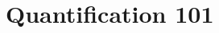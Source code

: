 \documentclass{article}
\numberwithin{equation}{section}
\theoremstyle{solution}
\begin{document}
\subsection{}
\subsection{}

\section{Quantification 101}

\subsection{}
\subsection{}
\subsection{}
\subsection{}
\end{document}
